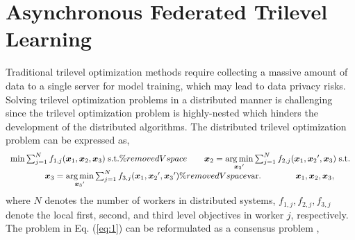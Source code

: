 \documentclass[letterpaper]{article}
\begin{document}
\section{Asynchronous Federated Trilevel Learning}
Traditional trilevel optimization methods require collecting a massive amount of data to a single server for model training, which may lead to data privacy risks. Solving trilevel optimization problems in a distributed manner is challenging since the trilevel optimization problem is highly-nested which hinders the development of the distributed algorithms.
The distributed trilevel optimization problem can be expressed as,
\begin{equation}
\label{eq:1}
\begin{array}{l}
\min \sum\nolimits_{j = 1}^N {{f_{1,j}}({\boldsymbol{x}_1},{\boldsymbol{x}_2},{\boldsymbol{x}_3})} \;{\rm{s}}.{\rm{t}}. \%removedVspace
\qquad {\boldsymbol{x}_2} = \mathop {\arg \min }\limits_{{\boldsymbol{x}_2}'} \sum\nolimits_{j = 1}^N {{f_{2,j}}({\boldsymbol{x}_1},{\boldsymbol{x}_2}',{\boldsymbol{x}_3})} \;{\rm{s}}.{\rm{t}}. \\
\qquad \qquad {\boldsymbol{x}_3} = \mathop {\arg \min }\limits_{{\boldsymbol{x}_3}'} \sum\nolimits_{j = 1}^N {{f_{3,j}}({\boldsymbol{x}_1},{\boldsymbol{x}_2}',{\boldsymbol{x}_3}')} \%removedVspace
{\mathop{\rm var}}. \qquad \qquad {\boldsymbol{x}_1},{\boldsymbol{x}_2},{\boldsymbol{x}_3},
\end{array}
\end{equation}
where $N$ denotes the number of workers in distributed systems, $f_{1,j}, f_{2,j}, f_{3,j}$ denote the local first, second, and third level objectives in worker $j$, respectively. The problem in Eq. (\ref{eq:1}) can be reformulated as a consensus problem \cite{zhang2014asynchronous,jiao2022distributed},
\end{document}
